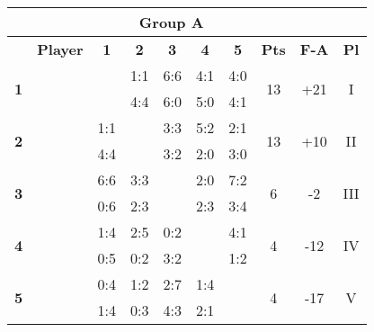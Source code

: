 \documentclass[10pt]{article}
\newcommand{\red}{\color{red}}
\newcommand{\blue}{\color{blue}}
\newcommand{\blank}{\cellcolor[gray]{.5}}
\begin{document}
\vspace{1cm}
\hspace{-5cm}
\begin{tabular}{|c|p{2.8cm}|c|c|c|c|c|c|c|c|}
	\multicolumn{9}{c}{\bf Group A} \\ \hline
	& \bf Player & \bf1 & \bf2 & \bf3 & \bf4 & \bf5 & \bf Pts & \bf F-A & \bf Pl \\ \hline
	\multirow{2}{*}{\bf1}&\multirow{2}{*}{}      & \blank & 1:1 & 6:6 & \red4:1 & \red4:0 &\multirow{2}{*}{13}&\multirow{2}{*}{+21}&\multirow{2}{*}{I} \\ && \blank & 4:4 & \red6:0 & \red5:0 & \red4:1 &&& \\ \hline
	\multirow{2}{*}{\bf2}&\multirow{2}{*}{}     & 1:1 & \blank & 3:3 & \red5:2 & \red2:1 &\multirow{2}{*}{13}&\multirow{2}{*}{+10}&\multirow{2}{*}{II} \\      && 4:4 & \blank & \red3:2 & \red2:0 & \red3:0 &&& \\ \hline
	\multirow{2}{*}{\bf3}&\multirow{2}{*}{}     & 6:6 & 3:3 & \blank & \red2:0 & \red7:2 &\multirow{2}{*}{6}&\multirow{2}{*}{-2}&\multirow{2}{*}{III} \\     && \blue0:6 & \blue2:3 & \blank & \blue2:3 & \blue3:4 &&& \\ \hline
	\multirow{2}{*}{\bf4}&\multirow{2}{*}{}     & \blue1:4 & \blue2:5 & \blue0:2 & \blank & \red4:1 &\multirow{2}{*}{4}&\multirow{2}{*}{-12}&\multirow{2}{*}{IV} \\     && \blue0:5 & \blue0:2 & \red3:2 & \blank & \blue1:2 &&& \\ \hline
	\multirow{2}{*}{\bf5}&\multirow{2}{*}{}     & \blue0:4 & \blue1:2 & \blue2:7 & \blue1:4 & \blank &\multirow{2}{*}{4}&\multirow{2}{*}{-17}&\multirow{2}{*}{V} \\     && \blue1:4 & \blue0:3 & \red4:3 & \red2:1 & \blank &&& \\ \hline
\end{tabular}
\hspace{0.2cm}
\end{document}
